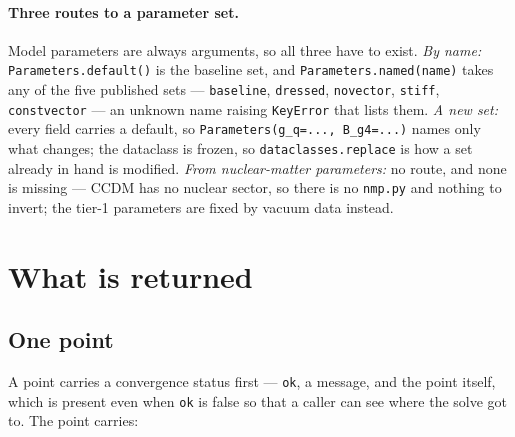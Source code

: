 \documentclass[11pt,a4paper]{article}
\newcommand{\code}[1]{\texttt{#1}}
\begin{document}
\paragraph{Three routes to a parameter set.} Model parameters are always
arguments, so all three have to exist. \emph{By name:}
\texttt{Parameters.default()} is the baseline set, and
\texttt{Parameters.named(name)} takes any of the five published sets ---
\texttt{baseline}, \texttt{dressed}, \texttt{novector}, \texttt{stiff},
\texttt{constvector} --- an
unknown name raising \texttt{KeyError} that lists them. \emph{A new set:} every
field carries a default, so \texttt{Parameters(g\_q=..., B\_g4=...)} names only
what changes; the dataclass is frozen, so \texttt{dataclasses.replace} is how a
set already in hand is modified. \emph{From nuclear-matter parameters:} no
route, and none is missing --- CCDM has no nuclear sector, so there is no
\texttt{nmp.py} and nothing to invert; the tier-1 parameters are fixed by
vacuum data instead.

\section{What is returned}
\label{sec:returns}

\subsection{One point}

A point carries a convergence status first --- \code{ok}, a message, and the
point itself, which is present even when \code{ok} is false so that a caller
can see where the solve got to. The point carries:
\end{document}
